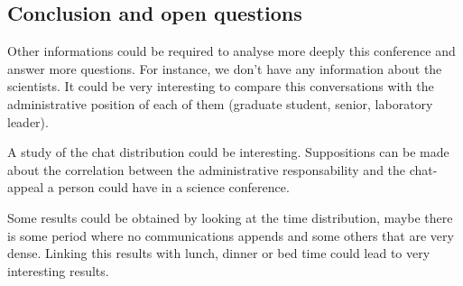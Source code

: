 \subsection{Conclusion and open questions}

Other informations could be required to analyse more deeply this conference and answer more questions. 
For instance, we don't 
have any information about the scientists. It could be very interesting to compare this conversations
with the administrative position of each of them (graduate student, senior, laboratory leader).

A study of the chat distribution could be interesting. Suppositions can be made about the correlation
between the administrative responsability and the chat-appeal a person could have in a science conference.

Some results could be obtained by looking at the time distribution, maybe there is some period where
no communications appends and some others that are very dense. Linking this results with lunch, dinner or
bed time could lead to very interesting results.



